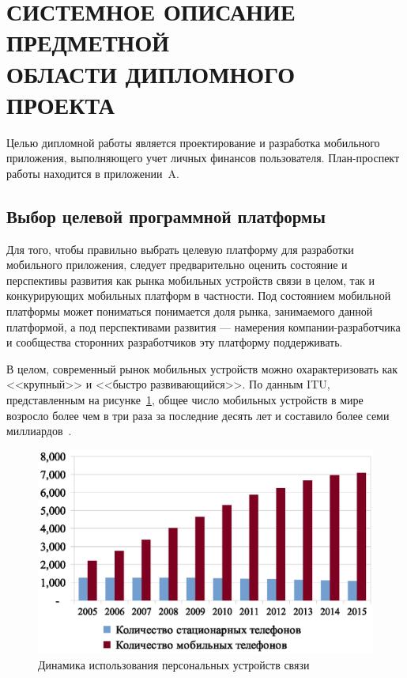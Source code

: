 \section[Системное описание предметной области дипломного проекта]{%
  СИСТЕМНОЕ ОПИСАНИЕ ПРЕДМЕТНОЙ \\
  ОБЛАСТИ ДИПЛОМНОГО ПРОЕКТА
}\label{sec:spec}

Целью дипломной работы является проектирование и
разработка мобильного приложения, выполняющего учет личных финансов пользователя.
План-проспект работы находится в приложении~A.

\subsection{Выбор целевой программной платформы}

Для того, чтобы правильно выбрать целевую платформу для разработки
мобильного приложения, следует предварительно оценить состояние и
перспективы развития как рынка мобильных устройств связи в целом,
так и конкурирующих мобильных платформ в частности.
Под состоянием мобильной платформы может пониматься понимается
доля рынка, занимаемого данной платформой,
а под перспективами развития --- намерения компании-разработчика и
сообщества сторонних разработчиков эту платформу поддерживать.

В целом, современный рынок мобильных устройств можно охарактеризовать
как <<крупный>> и <<быстро развивающийся>>.
По данным ITU, представленным на рисунке~\ref{fig:stat_phone},
общее число мобильных устройств в мире возросло
более чем в три раза за последние десять лет
и составило более семи миллиардов~\cite{itu_stat_phone}.

\begin{figure}[h!]
  \centering
  \includegraphics[width=150mm]{fig/stat_phone.eps}
  \caption{Динамика использования персональных устройств связи}
  \label{fig:stat_phone}
\end{figure}

